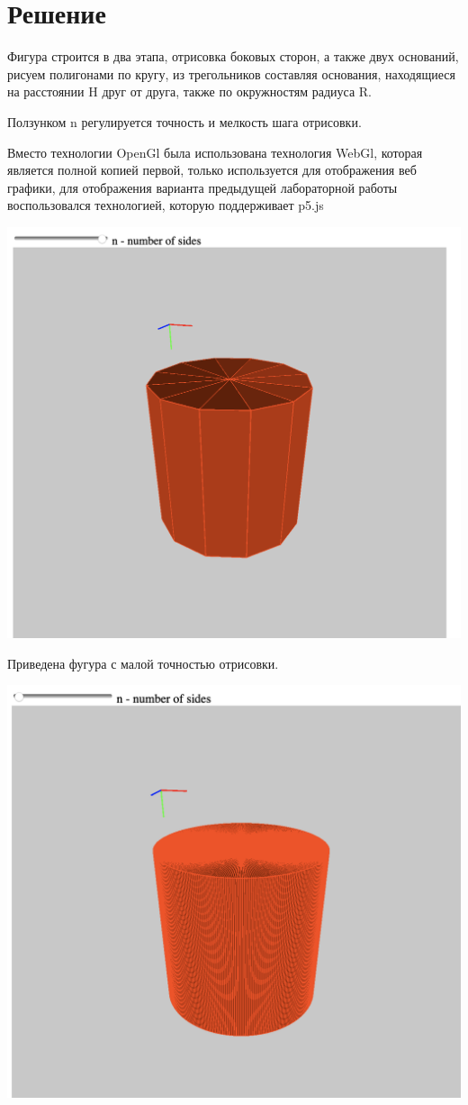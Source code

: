 \section{Решение}

Фигура строится в два этапа, отрисовка боковых сторон, а также двух оснований, рисуем полигонами по кругу, из трегольников составляя основания, находящиеся на расстоянии H друг от друга, также по окружностям радиуса R.


Ползунком n регулируется точность и мелкость шага отрисовки.

Вместо технологии OpenGl была использована технология WebGl, которая является полной копией первой, только используется для отображения веб графики, для отображения варианта предыдущей лабораторной работы воспользовался технологией, которую поддерживает p5.js

\includegraphics[scale=0.5]{pictures/1.png}

Приведена фугура с малой точностью отрисовки.

\includegraphics[scale=0.4]{pictures/2.png}

